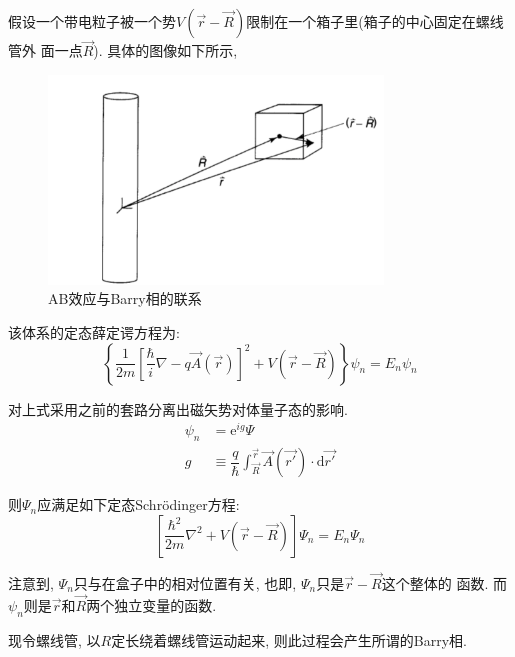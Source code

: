 \documentclass[a4paper, 11pt]{article}
\begin{document}
\begin{spacing}{1.2}
        假设一个带电粒子被一个势$V(\vec{r}−\vec{R})$限制在一个箱子里(箱子的中心固定在螺线管外
        面一点$\vec{R}$). 具体的图像如下所示,

        \begin{figure}[H]
          \centering\includegraphics[width=3.5in]{image/Barry-ABeffect}
          \caption{AB效应与Barry相的联系}\label{AB_effect_Barry} 
        \end{figure}

        该体系的定态薛定谔方程为: 
        \begin{equation}
          \left\{\dfrac{1}{2m}\left[\dfrac{\hbar}{i}\nabla-q\vec{A}(\vec{r})\right]^2 + %
          V(\vec{r}-\vec{R})\right\}\psi_n = E_n\psi_n
        \end{equation}

        对上式采用之前的套路分离出磁矢势对体量子态的影响. 
        \begin{equation}
          \label{2009_psin}
          \begin{aligned}
            \psi_n &= \mathrm{e}^{ig}\Psi\\
                 g &\equiv \dfrac{q}{\hbar}\int_{\vec{R}}^{\vec{r}}\vec{A}(\vec{r'})%
                                           \cdot\mathrm{d}\vec{r'}
          \end{aligned}
        \end{equation}

        则$\Psi_n$应满足如下定态Schr\"odinger方程:
        \begin{equation}
          \left[\dfrac{\hbar^2}{2m}\nabla^2+V(\vec{r}-\vec{R})\right]\Psi_n = E_n\Psi_n
        \end{equation}

        注意到, $\Psi_n$只与在盒子中的相对位置有关, 也即, $\Psi_n$只是$\vec{r}-\vec{R}$这个整体的
        函数. 而$\psi_n$则是$\vec{r}$和$\vec{R}$两个独立变量的函数.

        现令螺线管, 以$R$定长绕着螺线管运动起来, 则此过程会产生所谓的Barry相.


\end{spacing}
\end{document}

